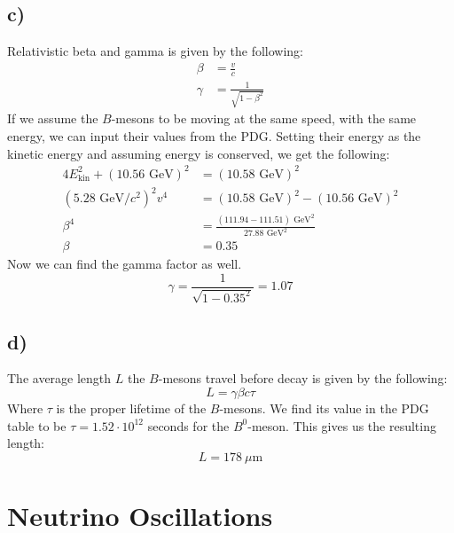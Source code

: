 \documentclass{article}
\begin{document}
\subsection*{c)}
Relativistic beta and gamma is given by the following:
\begin{align}\label{eq: b_g}
β &= \frac{v}{c} \\
γ &= \frac{1}{\sqrt{1 - β^2}}
\end{align}
If we assume the $B$-mesons to be moving at the same speed, with the same energy, we can input their values from the PDG. Setting their energy as the kinetic energy and assuming energy is conserved, we get the following:
\begin{align}
4E^2_{\text{kin}} + (10.56 \text{ GeV})^2 &= (10.58 \text{ GeV})^2 \\
(5.28 \text{ GeV} / c^2)^2 v^4 &= (10.58 \text{ GeV})^2 - (10.56 \text{ GeV})^2 \\
β^{4} &= \frac{(111.94 - 111.51) \text{ GeV}^2}{27.88 \text{ GeV}^2} \\
β &= 0.35
\end{align}
Now we can find the gamma factor as well. 
\begin{equation}
  γ = \frac{1}{\sqrt{1 - 0.35^2}} = 1.07
\end{equation}


\subsection*{d)}
The average length $L$ the $B$-mesons travel before decay is given by the following:
\begin{equation}
  L = γβcτ 
\end{equation}
Where $τ$ is the proper lifetime of the $B$-mesons. We find its value in the PDG table to be $τ = 1.52 ⋅ 10^{12}$ seconds for the $B^{0}$-meson. This gives us the resulting length:
\begin{equation}
  L = 178 \ μ\text{m}
\end{equation} 



\section{Neutrino Oscillations}
\end{document}
